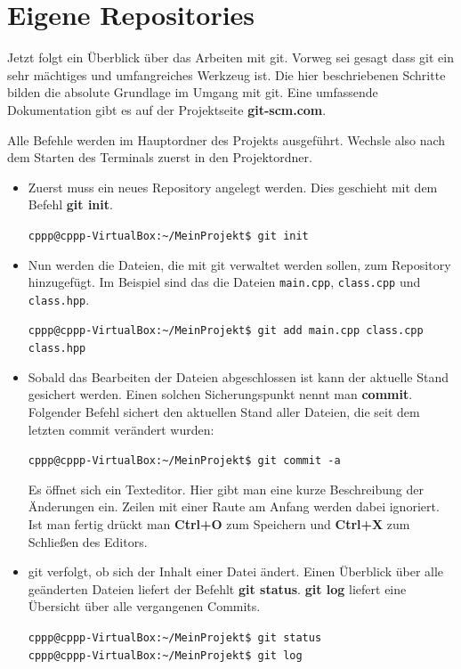 \documentclass[
  accentcolor=tud1c,	%
  colorbacktitle,		%
  inverttitle,			%
  german,
  twoside
]{tudreport}
\begin{document}
\section{Eigene Repositories}
Jetzt folgt ein Überblick über das Arbeiten mit git. Vorweg sei gesagt dass git ein sehr mächtiges und umfangreiches Werkzeug ist. Die hier beschriebenen Schritte bilden die absolute Grundlage im Umgang mit git. Eine umfassende Dokumentation gibt es auf der Projektseite \textbf{git-scm.com}.

Alle Befehle werden im Hauptordner des Projekts ausgeführt. Wechsle also nach dem Starten des Terminals zuerst in den Projektordner.

\begin{itemize}
\item Zuerst muss ein neues Repository angelegt werden. Dies geschieht mit dem Befehl \textbf{git init}.

\texttt{cppp@cppp-VirtualBox:\textasciitilde/MeinProjekt\$ git init}

\item Nun werden die Dateien, die mit git verwaltet werden sollen, zum Repository hinzugefügt. Im Beispiel sind das die Dateien \texttt{main.cpp}, \texttt{class.cpp} und \texttt{class.hpp}.

\texttt{cppp@cppp-VirtualBox:\textasciitilde/MeinProjekt\$ git add main.cpp class.cpp class.hpp}

\item Sobald das Bearbeiten der Dateien abgeschlossen ist kann der aktuelle Stand gesichert werden. Einen solchen Sicherungspunkt nennt man \textbf{commit}. Folgender Befehl sichert den aktuellen Stand aller Dateien, die seit dem letzten commit verändert wurden:

\texttt{cppp@cppp-VirtualBox:\textasciitilde/MeinProjekt\$ git commit -a}

Es öffnet sich ein Texteditor. Hier gibt man eine kurze Beschreibung der Änderungen ein. Zeilen mit einer Raute am Anfang werden dabei ignoriert. Ist man fertig drückt man \textbf{Ctrl+O} zum Speichern und \textbf{Ctrl+X} zum Schließen des Editors.

\item git verfolgt, ob sich der Inhalt einer Datei ändert. Einen Überblick über alle geänderten Dateien liefert der Befehlt \textbf{git status}. \textbf{git log} liefert eine Übersicht über alle vergangenen Commits.

\texttt{cppp@cppp-VirtualBox:\textasciitilde/MeinProjekt\$ git status}\\
\texttt{cppp@cppp-VirtualBox:\textasciitilde/MeinProjekt\$ git log}

\end{itemize}
\end{document}
